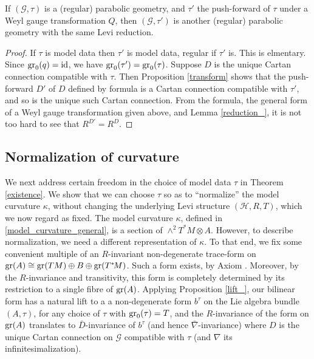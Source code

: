 \documentclass[leqno,12pt]{amsart} %
\begin{document}
\begin{proposition}
  If $({\mathcal G}, \tau)$ is a (regular) parabolic geometry, and $\tau'$ the
  push-forward of $\tau $ under a Weyl gauge transformation $Q$, then
  $({\mathcal G}, \tau')$ is another (regular) parabolic geometry with the same Levi
  reduction.
\end{proposition}

\begin{proof}
  If $\tau $ is model data then $\tau'$ is model data, regular if $\tau'$ is. This is
  elmentary. Since $\operatorname{\operatorname{gr}}_0(q)=\mathrm{id}$, we have $\operatorname{\operatorname{gr}}_0(\tau')=\operatorname{\operatorname{gr}}_0(\tau)$.
  Suppose $D$ is the unique Cartan connection compatible with $\tau $. Then Proposition
  \ref{transform} shows that the push-forward $D'$ of $D$ defined by formula
   is a Cartan connection compatible with $\tau'$, and so is
  the unique such Cartan connection. From the formula, the general form of a Weyl gauge
  transformation given above, and Lemma \ref{reduction_}, it is not too hard to see that
  $R^{D'}=R^D$.
\end{proof}

\subsection{Normalization of curvature}\label{normalization}
We next address certain freedom in the choice of model data $\tau $ in Theorem
\ref{existence}. We show that we can choose $\tau $ so as to ``normalize'' the model
curvature $\kappa$, without changing the underlying Levi structure $({\mathcal H}, R, T)$,
which we now regard as fixed. The model curvature $\kappa$, defined in
\ref{model_curvature_general}, is a section of $\wedge^2 T^*\!M \otimes A$. However, to
describe normalization, we need a different representation of $\kappa$. To that end, we
fix some convenient multiple of an $R$-invariant non-degenerate trace-form on
$\operatorname{\operatorname{gr}}(A) \cong \operatorname{\operatorname{gr}}(TM)\oplus B \oplus \operatorname{\operatorname{gr}}(T^*\!M)$. Such a form exists, by
Axiom . Moreover, by the $R$-invariance and transitivity,
this form is completely determined by its restriction to a single fibre of
$\operatorname{\operatorname{gr}}(A)$. Applying Proposition \ref{lift_}, our bilinear form has a natural lift to a
a non-degenerate form $b^\tau$ on the Lie algebra bundle $(A, \tau)$, for any choice of
$\tau $ with $\operatorname{\operatorname{gr}}_0(\tau)=T$, and the $R$-invariance of the form on $\operatorname{\operatorname{gr}}(A)$
translates to $\bar D$-invariance of $b^\tau$ (and hence $\bar\nabla$-invariance) where
$D $ is the unique Cartan connection on ${\mathcal G} $ compatible with $\tau$ (and
$\nabla $ its infinitesimalization).
\end{document}
